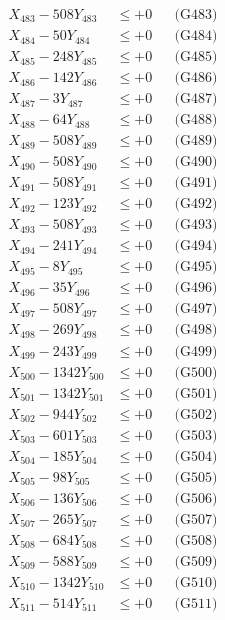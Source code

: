 \documentclass[a4paper,10pt]{article}
\begin{document}
{\begin{align}
X_{483} - 508Y_{483} &\leq +0 && \text{(G483)} \\
X_{484} - 50Y_{484} &\leq +0 && \text{(G484)} \\
X_{485} - 248Y_{485} &\leq +0 && \text{(G485)} \\
X_{486} - 142Y_{486} &\leq +0 && \text{(G486)} \\
X_{487} - 3Y_{487} &\leq +0 && \text{(G487)} \\
X_{488} - 64Y_{488} &\leq +0 && \text{(G488)} \\
X_{489} - 508Y_{489} &\leq +0 && \text{(G489)} \\
X_{490} - 508Y_{490} &\leq +0 && \text{(G490)} \\
\allowbreak
X_{491} - 508Y_{491} &\leq +0 && \text{(G491)} \\
X_{492} - 123Y_{492} &\leq +0 && \text{(G492)} \\
X_{493} - 508Y_{493} &\leq +0 && \text{(G493)} \\
X_{494} - 241Y_{494} &\leq +0 && \text{(G494)} \\
X_{495} - 8Y_{495} &\leq +0 && \text{(G495)} \\
X_{496} - 35Y_{496} &\leq +0 && \text{(G496)} \\
X_{497} - 508Y_{497} &\leq +0 && \text{(G497)} \\
X_{498} - 269Y_{498} &\leq +0 && \text{(G498)} \\
X_{499} - 243Y_{499} &\leq +0 && \text{(G499)} \\
X_{500} - 1342Y_{500} &\leq +0 && \text{(G500)} \\
\allowbreak
X_{501} - 1342Y_{501} &\leq +0 && \text{(G501)} \\
X_{502} - 944Y_{502} &\leq +0 && \text{(G502)} \\
X_{503} - 601Y_{503} &\leq +0 && \text{(G503)} \\
X_{504} - 185Y_{504} &\leq +0 && \text{(G504)} \\
X_{505} - 98Y_{505} &\leq +0 && \text{(G505)} \\
X_{506} - 136Y_{506} &\leq +0 && \text{(G506)} \\
X_{507} - 265Y_{507} &\leq +0 && \text{(G507)} \\
X_{508} - 684Y_{508} &\leq +0 && \text{(G508)} \\
X_{509} - 588Y_{509} &\leq +0 && \text{(G509)} \\
X_{510} - 1342Y_{510} &\leq +0 && \text{(G510)} \\
\allowbreak
X_{511} - 514Y_{511} &\leq +0 && \text{(G511)} \\

\end{align}}
\end{document}
